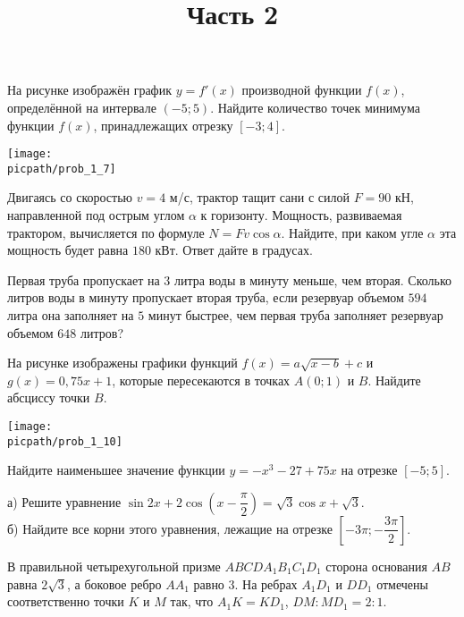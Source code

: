 \begin{training}[1]
\begin{listofex}[resume]
		\foranswer
		\item
		На рисунке изображён график \( y = f'(x) \)
		производной функции \( f(x) \),
		определённой на интервале \( (-5; 5) \).
		Найдите количество точек минимума функции \( f(x) \),
		принадлежащих отрезку \( [-3; 4] \).
		\begin{center}
			\texttt{[image: \\picpath/prob\_1\_7]}
		\end{center}
		\foranswer
		\item Двигаясь со скоростью \( v = 4 \) м/с, трактор тащит сани с силой \( F = 90 \) кН,
		направленной под острым углом \( \alpha \) к горизонту.
		Мощность, развиваемая трактором, вычисляется по формуле \( N = F v \cos \alpha \).
		Найдите, при каком угле \( \alpha \) эта мощность будет равна \( 180 \) кВт.
		Ответ дайте в градусах.
		\foranswer
		\item Первая труба пропускает на \( 3 \) литра воды в минуту меньше,
		чем вторая. Сколько литров воды в минуту пропускает вторая труба,
		если резервуар объемом \( 594 \) литра она заполняет на \( 5 \) минут быстрее,
		чем первая труба заполняет резервуар объемом \( 648 \) литров?
		\foranswer
		\newpage
		\hphantom{Часть 1}
		\item 
		На рисунке изображены графики функций \( f(x) = a\sqrt{x-b}+c \) и \( g(x) = 0,75x+1 \),
		которые пересекаются в точках \( A (0;1) \) и \( B \). Найдите абсциссу точки \( B \).
		\begin{center}
			\texttt{[image: \\picpath/prob\_1\_10]}
		\end{center}
		\foranswer
		\item Найдите наименьшее значение функции \( y=-x^3-27+75x \) на отрезке \( [-5;5] \).
		\foranswer
		\egepreambtwo
		\title{Часть 2}
		\egepreambthree
		\item
		а) Решите уравнение \( \sin2x + 2\cos \left( x - \dfrac{\pi}{2} \right) = \sqrt{3}\cos x + \sqrt{3} \).\\
		б) Найдите все корни этого уравнения, лежащие на отрезке \( \left[ -3\pi;-\dfrac{3\pi}{2} \right] \).
		\newpage
		\hphantom{Часть 1}
		\item
		В правильной четырехугольной призме \( ABCDA_1B_1C_1D_1 \) сторона
		основания \( AB \) равна \( 2\sqrt{3} \), а боковое ребро \( AA_1 \) равно \( 3 \).
		На ребрах \( A_1D_1 \) и \( DD_1 \) отмечены соответственно точки \( K \) и \( M \) так,
		что \( A_1K = KD_1 \), \( DM : MD_1 = 2 : 1 \).\\

\end{listofex}
\end{training}
